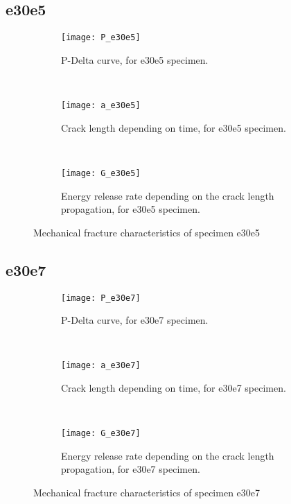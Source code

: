 \subsection{e30e5}

\begin{figure}[H]
	\centering
	\begin{subfigure}{0.48\linewidth}
		\centering
		\texttt{[image: P\_e30e5]}
		\decoRule
		\caption{P-Delta curve, for e30e5 specimen.}
		\label{fig:P_e30e5}
	\end{subfigure}
	\hfill \\
	\begin{subfigure}{0.48\linewidth}
		\centering
		\texttt{[image: a\_e30e5]}
		\decoRule
		\caption{Crack length depending on time, for e30e5 specimen.}
		\label{fig:a_e30e5}
	\end{subfigure}
	\hfill\\
	\begin{subfigure}{0.48\linewidth}
		\centering
		\texttt{[image: G\_e30e5]}
		\decoRule
		\caption{Energy release rate depending on the crack length propagation, for e30e5 specimen.}
		\label{fig:G_e30e5}
	\end{subfigure}
	\caption{Mechanical fracture characteristics of specimen e30e5}
	\label{e30e5}
\end{figure}

\subsection{e30e7}

\begin{figure}[H]
	\centering
	\begin{subfigure}{0.48\linewidth}
		\centering
		\texttt{[image: P\_e30e7]}
		\decoRule
		\caption{P-Delta curve, for e30e7 specimen.}
		\label{fig:P_e30e7}
	\end{subfigure}
	\hfill \\
	\begin{subfigure}{0.48\linewidth}
		\centering
		\texttt{[image: a\_e30e7]}
		\decoRule
		\caption{Crack length depending on time, for e30e7 specimen.}
		\label{fig:a_e30e7}
	\end{subfigure}
	\hfill\\
	\begin{subfigure}{0.48\linewidth}
		\centering
		\texttt{[image: G\_e30e7]}
		\decoRule
		\caption{Energy release rate depending on the crack length propagation, for e30e7 specimen.}
		\label{fig:G_e30e7}
	\end{subfigure}
	\caption{Mechanical fracture characteristics of specimen e30e7}
	\label{e30e7}
\end{figure}





